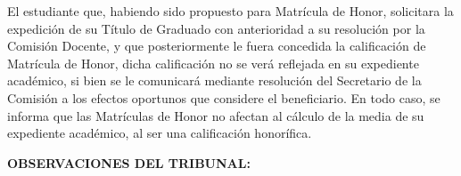 \documentclass[11pt,a4paper,oneside]{article}
\begin{document}
\noindent El estudiante que, habiendo sido propuesto para Matrícula de Honor, solicitara la expedición de su Título de Graduado con anterioridad a su resolución por la Comisión Docente, y que posteriormente le fuera concedida la calificación de Matrícula de Honor, dicha calificación no se verá reflejada en su expediente académico, si bien se le comunicará mediante resolución del Secretario de la Comisión a los efectos oportunos que considere el beneficiario. En todo caso, se informa que las Matrículas de Honor no afectan al cálculo de la media de su expediente académico, al ser una calificación honorífica.

\newpage

\thispagestyle{plain}



\vspace*{-.8in} %

\noindent\textbf{OBSERVACIONES DEL TRIBUNAL:}

\newpage




\end{document}
